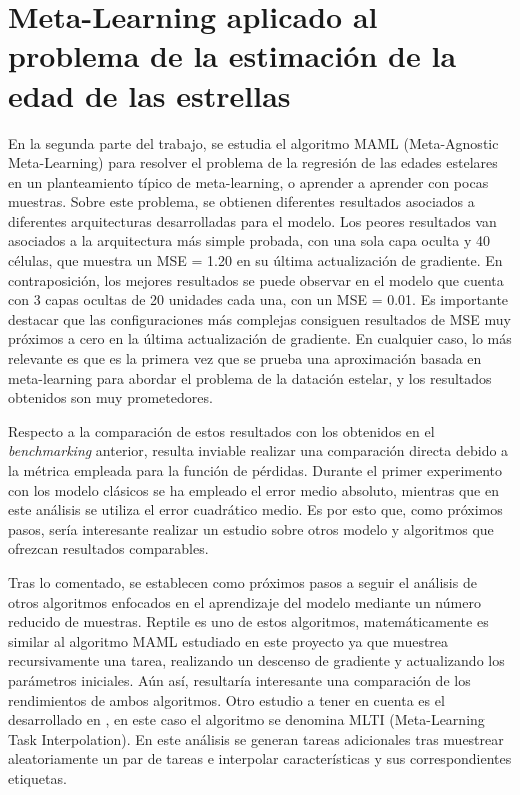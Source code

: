 
\section{Meta-Learning aplicado al problema de la estimación de la edad de las estrellas}

En la segunda parte del trabajo, se estudia el algoritmo MAML (Meta-Agnostic Meta-Learning) para resolver el problema de la regresión de las edades estelares en un planteamiento típico de meta-learning, o aprender a aprender con pocas muestras. Sobre este problema, se obtienen diferentes resultados asociados a diferentes arquitecturas desarrolladas para el modelo. Los peores resultados van asociados a la arquitectura más simple probada, con una sola capa oculta y 40 células,  que muestra un MSE = 1.20 en su última actualización de gradiente. En contraposición, los mejores resultados se puede observar en el modelo que cuenta con 3 capas ocultas de 20 unidades cada una, con un MSE = 0.01. 
Es importante destacar que las configuraciones más complejas consiguen resultados de MSE muy próximos a cero en la última actualización de gradiente.
En cualquier caso, lo más relevante es que es la primera vez que se prueba una aproximación basada en meta-learning para abordar el problema de la datación estelar, y los resultados obtenidos son muy prometedores.

Respecto a la comparación de estos resultados con los obtenidos en el \emph{benchmarking} anterior, resulta inviable realizar una comparación directa debido a la métrica empleada para la función de pérdidas. Durante el primer experimento con los modelo clásicos se ha empleado el error medio absoluto, mientras que en este análisis se utiliza el error cuadrático medio. Es por esto que, como próximos pasos, sería interesante realizar un estudio sobre otros modelo y algoritmos que ofrezcan resultados comparables.

Tras lo comentado, se establecen como próximos pasos a seguir el análisis de otros algoritmos enfocados en el aprendizaje del modelo mediante un número reducido de muestras. Reptile \cite{nichol2018firstorder} es uno de estos algoritmos, matemáticamente es similar al algoritmo MAML estudiado en este proyecto ya que muestrea recursivamente una tarea, realizando un descenso de gradiente y actualizando los parámetros iniciales. Aún así, resultaría interesante una comparación de los rendimientos de ambos algoritmos. Otro estudio a tener en cuenta es el desarrollado en \cite{yao2021metalearning}, en este caso el algoritmo se denomina MLTI (Meta-Learning Task Interpolation). En este análisis se generan tareas adicionales tras muestrear aleatoriamente un par de tareas e interpolar características y sus correspondientes etiquetas.
 

